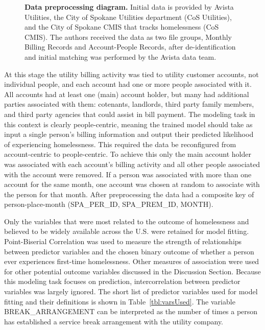 \documentclass[10pt,letterpaper]{article}
\begin{document}
\begin{figure}
    \centering
    \caption{{\bf Data preprocessing diagram.} Initial data is provided by Avista Utilities, the City of Spokane Utilities department (CoS Utilities), and the City of Spokane CMIS that tracks homelessness (CoS CMIS). The authors received the data as two file groups, Monthly Billing Records and Account-People Records, after de-identification and initial matching was performed by the Avista data team.}
    \label{fig:preprocessing}
\end{figure}

At this stage the utility billing activity was tied to utility customer accounts, not individual people, and each account had one or more people associated with it. All accounts had at least one (main) account holder, but many had additional parties associated with them: cotenants, landlords, third party family members, and third party agencies that could assist in bill payment. The modeling task in this context is clearly people-centric, meaning the trained model should take as input a single person's billing information and output their predicted likelihood of experiencing homelessness. This required the data be reconfigured from account-centric to people-centric. To achieve this only the main account holder was associated with each account's billing activity and all other people associated with the account were removed. If a person was associated with more than one account for the same month, one account was chosen at random to associate with the person for that month. After preprocessing the data had a composite key of person-place-month (SPA\_PER\_ID, SPA\_PREM\_ID, MONTH).

Only the variables that were most related to the outcome of homelessness and believed to be widely available across the U.S. were retained for model fitting. Point-Biserial Correlation was used to measure the strength of relationships between predictor variables and the chosen binary outcome of whether a person ever experiences first-time homelessness. Other measures of association were used for other potential outcome variables discussed in the Discussion Section. Because this modeling task focuses on prediction, intercorrelation between predictor variables was largely ignored. The short list of predictor variables used for model fitting and their definitions is shown in Table~\ref{tbl:varsUsed}. The variable BREAK\_ARRANGEMENT can be interpreted as the number of times a person has established a service break arrangement with the utility company.
\end{document}

